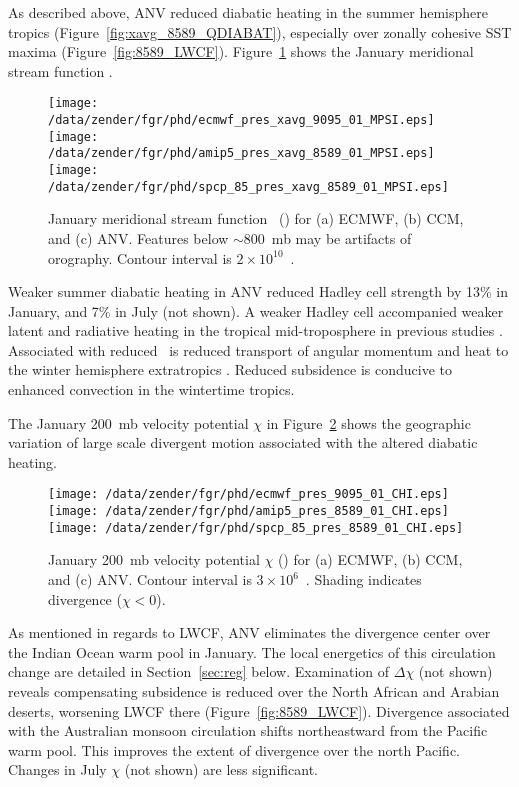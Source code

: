 \documentclass[agums]{aguplus}
\begin{document}
As described above, ANV reduced diabatic heating in the summer
hemisphere tropics (Figure~\ref{fig:xavg_8589_QDIABAT}), especially
over zonally cohesive SST maxima (Figure~\ref{fig:8589_LWCF}).
Figure~\ref{fig:pres_xavg_8589_01_MPSI} shows the January meridional
stream function \mpsi.  
\begin{figure}
\begin{center}
\texttt{[image: /data/zender/fgr/phd/ecmwf\_pres\_xavg\_9095\_01\_MPSI.eps]}\vfill
\texttt{[image: /data/zender/fgr/phd/amip5\_pres\_xavg\_8589\_01\_MPSI.eps]}\vfill
\texttt{[image: /data/zender/fgr/phd/spcp\_85\_pres\_xavg\_8589\_01\_MPSI.eps]}\vfill
\end{center}
\caption[January meridional stream function \mpsi\ for ECMWF, CCM, and
ANV]{ 
January meridional stream function \mpsi\ (\kgxs)
for (a) ECMWF, (b) CCM, and (c) ANV.
Features below $\sim 800$~mb may be artifacts of orography.
Contour interval is $2 \times 10^{10}$~\kgxs.  
\label{fig:pres_xavg_8589_01_MPSI}}
\end{figure}
Weaker summer diabatic heating in ANV reduced Hadley cell strength by
13\% in January, and 7\% in July (not shown).
A weaker Hadley cell accompanied weaker latent and radiative heating
in the tropical mid-troposphere in previous studies
\cite[e.g.,][]{RHD89,SRB94}.
Associated with reduced \mpsi\ is reduced transport of angular
momentum and heat to the winter hemisphere extratropics
\cite[e.g.,][]{LiH88}. 
Reduced subsidence is conducive to enhanced convection in the
wintertime tropics.

The January 200~mb velocity potential $\chi$ in
Figure~\ref{fig:pres_8589_01_CHI} shows the geographic variation of
large scale divergent motion associated with the altered diabatic
heating.  
\begin{figure}
\begin{center}
\texttt{[image: /data/zender/fgr/phd/ecmwf\_pres\_9095\_01\_CHI.eps]}\vfill
\texttt{[image: /data/zender/fgr/phd/amip5\_pres\_8589\_01\_CHI.eps]}\vfill
\texttt{[image: /data/zender/fgr/phd/spcp\_85\_pres\_8589\_01\_CHI.eps]}\vfill
\end{center}
\caption[January 200~mb velocity potential $\chi$ for
ECMWF, CCM, and ANV]{
January 200~mb velocity potential $\chi$ (\mSxs) for (a)  
ECMWF, (b) CCM, and (c) ANV.
Contour interval is $3 \times 10^6$~\mSxs. 
Shading indicates divergence ($\chi < 0$).
\label{fig:pres_8589_01_CHI}}
\end{figure}
As mentioned in regards to LWCF, ANV eliminates the divergence center
over the Indian Ocean warm pool in January.
The local energetics of this circulation change are detailed in
Section~\ref{sec:reg} below. 
Examination of $\Delta \chi$ (not shown) reveals compensating
subsidence is reduced over the North African and Arabian deserts,
worsening LWCF there (Figure~\ref{fig:8589_LWCF}). 
Divergence associated with the Australian monsoon circulation shifts
northeastward from the Pacific warm pool.
This improves the extent of divergence over the north Pacific.
Changes in July $\chi$ (not shown) are less significant.
\end{document}
